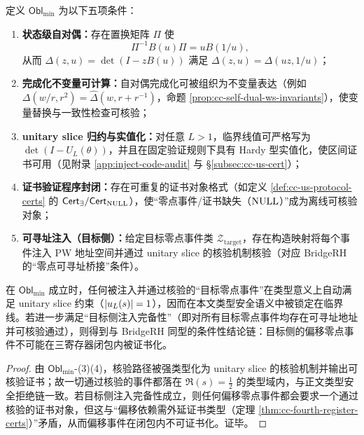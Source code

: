\begin{definition}\label{def:cc-oblmin}
定义 $\mathsf{Obl}_{\min}$ 为以下五项条件：
\begin{enumerate}
  \item \textbf{状态级自对偶：}存在置换矩阵 $\Pi$ 使
  $$
  \Pi^{-1}B(u)\Pi=uB(1/u),
  $$
  从而 $\Delta(z,u)=\det(I-zB(u))$ 满足 $\Delta(z,u)=\Delta(uz,1/u)$；
  \item \textbf{完成化不变量可计算：}自对偶完成化可被组织为不变量表达（例如 \(\Delta(w/r,r^2)=\widehat\Delta(w,r+r^{-1})\)，命题 \ref{prop:cc-self-dual-ws-invariants}），使变量替换与一致性检查可核验；
  \item \textbf{unitary slice 归约与实值化：}对任意 $L>1$，临界线值可严格写为 $\det(I-U_L(\theta))$，并且在固定验证规则下具有 Hardy 型实值化，使区间证书可用（见附录 \ref{app:inject-code-audit} 与 \S\ref{subsec:cc-us-cert}）；
  \item \textbf{证书验证程序封闭：}存在可重复的证书对象格式（如定义 \ref{def:cc-us-protocol-certs} 的 $\mathsf{Cert}_\exists/\mathsf{Cert}_{\mathrm{NULL}}$），使“零点事件/证书缺失（$\mathrm{NULL}$）”成为离线可核验对象；
  \item \textbf{可寻址注入（目标侧）：}给定目标零点事件类 $\mathcal{Z}_{\mathrm{target}}$，存在构造映射将每个事件注入 PW 地址空间并通过 unitary slice 的核验机制核验（对应 BridgeRH 的“零点可寻址桥接”条件）。
\end{enumerate}
\end{definition}

\begin{theorem}[条件最小化的充分性]\label{thm:cc-oblmin-sufficient}
在 $\mathsf{Obl}_{\min}$ 成立时，任何被注入并通过核验的“目标零点事件”在类型意义上自动满足 unitary slice 约束（\(\left\lvert u_L(s)\right\rvert=1\)），因而在本文类型安全语义中被锁定在临界线。若进一步满足“目标侧注入完备性”（即对所有目标零点事件均存在可寻址地址并可核验通过），则得到与 BridgeRH 同型的条件性结论链：目标侧的偏移零点事件不可能在三寄存器闭包内被证书化。
\end{theorem}

\begin{proof}
由 $\mathsf{Obl}_{\min}$-(3)(4)，核验路径被强类型化为 unitary slice 的核验机制并输出可核验证书；故一切通过核验的事件都落在 $\Re(s)=\tfrac12$ 的类型域内，与正文类型安全拒绝链一致。若目标侧注入完备性成立，则任何偏移零点事件都会要求一个通过核验的证书对象，但这与“偏移依赖需外延证书类型（定理 \ref{thm:cc-fourth-register-certs}）”矛盾，从而偏移事件在闭包内不可证书化。证毕。
\end{proof}


